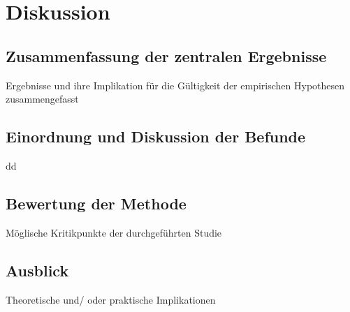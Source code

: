 \chapter{Diskussion}   \label{ch_4}
\section{Zusammenfassung der zentralen Ergebnisse}
Ergebnisse und ihre Implikation für die Gültigkeit der empirischen Hypothesen zusammengefasst


\section{Einordnung und Diskussion der Befunde}
dd


\section{Bewertung der Methode}
Möglische Kritikpunkte der durchgeführten Studie


\section{Ausblick}
Theoretische und/ oder praktische Implikationen